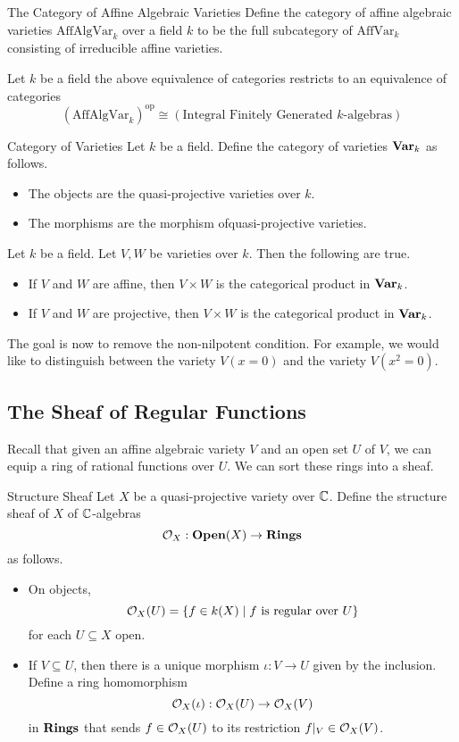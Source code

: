\documentclass[a4paper]{article}
\begin{document}
\begin{defn}{The Category of Affine Algebraic Varieties}{} Define the category of affine algebraic varieties $\text{AffAlgVar}_k$ over a field $k$ to be the full subcategory of $\text{AffVar}_k$ consisting of irreducible affine varieties. 
\end{defn}

\begin{prp}{}{} Let $k$ be a field the above equivalence of categories restricts to an equivalence of categories $$(\text{AffAlgVar}_k)^\text{op}\cong(\text{Integral Finitely Generated }k\text{-algebras})$$
\end{prp}

\begin{defn}{Category of Varieties}{} Let $k$ be a field. Define the category of varieties $\bold{Var}_k$ as follows. 
\begin{itemize}
\item The objects are the quasi-projective varieties over $k$. 
\item The morphisms are the morphism ofquasi-projective varieties. 
\end{itemize}
\end{defn}

\begin{lmm}{}{} Let $k$ be a field. Let $V,W$ be varieties over $k$. Then the following are true. 
\begin{itemize}
\item If $V$ and $W$ are affine, then $V\times W$ is the categorical product in $\bold{Var}_k$. 
\item If $V$ and $W$ are projective, then $V\times W$ is the categorical product in $\bold{Var}_k$. 
\end{itemize}
\end{lmm}

The goal is now to remove the non-nilpotent condition. For example, we would like to distinguish between the variety $V(x=0)$ and the variety $V(x^2=0)$. 

\subsection{The Sheaf of Regular Functions}
Recall that given an affine algebraic variety $V$ and an open set $U$ of $V$, we can equip a ring of rational functions over $U$. We can sort these rings into a sheaf. 

\begin{defn}{Structure Sheaf}{} Let $X$ be a quasi-projective variety over $\mathbb{C}$. Define the structure sheaf of $X$ of $\mathbb{C}$-algebras $$\mathcal{O}_X:\bold{Open}(X)\to\bold{Rings}$$ as follows. 
\begin{itemize}
\item On objects, $$\mathcal{O}_X(U)=\{f\in k(X)\;|\;f\text{ is regular over }U\}$$ for each $U\subseteq X$ open. 
\item If $V\subseteq U$, then there is a unique morphism $\iota:V\to U$ given by the inclusion. Define a ring homomorphism $$\mathcal{O}_X(\iota):\mathcal{O}_X(U)\to\mathcal{O}_X(V)$$ in $\bold{Rings}$ that sends $f\in\mathcal{O}_X(U)$ to its restriction $f|_V\in\mathcal{O}_X(V)$. 
\end{itemize}
\end{defn}
\end{document}
